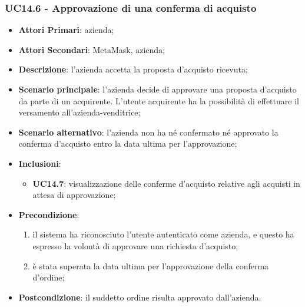\subsubsection{UC14.6 - Approvazione di una conferma di acquisto}
\begin{itemize}
	\item \textbf{Attori Primari}: azienda;
	\item \textbf{Attori Secondari}: MetaMask\glo, azienda;
	\item \textbf{Descrizione}: l'azienda accetta la proposta d'acquisto ricevuta;
	\item \textbf{Scenario principale}: l'azienda decide di approvare una proposta d'acquisto da parte di un acquirente. L'utente acquirente ha la possibilità di effettuare il versamento all'azienda-venditrice;
	\item \textbf{Scenario alternativo}: l'azienda non ha né confermato né approvato la conferma d'acquisto entro la data ultima per l'approvazione;
		\item \textbf{Inclusioni}: 
	\begin{itemize}
		\item \textbf{UC14.7}:  visualizzazione delle conferme d'acquisto relative agli acquisti in attesa di approvazione;
	\end{itemize}
	\item \textbf{Precondizione}: 
	\begin{enumerate}[label=\alph*.]
		\item il sistema ha riconosciuto l'utente autenticato come azienda, e questo ha espresso la volontà di approvare una richiesta d'acquisto;
		\item è stata superata la data ultima per l'approvazione della conferma d'ordine\glo;
	\end{enumerate}
	\item \textbf{Postcondizione}: il suddetto ordine risulta approvato dall'azienda.
\end{itemize}


